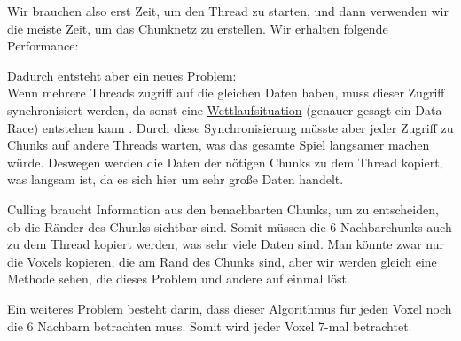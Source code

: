 Wir brauchen also erst Zeit, um den Thread zu starten,
und dann verwenden wir die meiste Zeit, um das
Chunknetz zu erstellen.
Wir erhalten folgende Performance:

\vspace{0.3cm}


\vspace{0.3cm}

Dadurch entsteht aber ein neues Problem: \\
Wenn mehrere Threads zugriff auf die gleichen Daten
haben, muss dieser Zugriff synchronisiert werden,
da sonst eine
\href{https://de.wikipedia.org/wiki/Wettlaufsituation}{Wettlaufsituation}
\cite{wiki_wettlauf} (genauer gesagt ein Data Race)
entstehen kann \cite{nomicon_races}.
Durch diese Synchronisierung müsste aber jeder Zugriff
zu Chunks auf andere Threads warten, was das gesamte
Spiel langsamer machen würde. Deswegen werden die
Daten der nötigen Chunks zu dem Thread kopiert,
was langsam ist, da es sich hier um sehr große Daten
handelt.

Culling braucht Information aus den benachbarten
Chunks, um zu entscheiden, ob die Ränder des Chunks
sichtbar sind. Somit müssen die 6 Nachbarchunks
auch zu dem Thread kopiert werden, was sehr viele
Daten sind. Man könnte zwar nur die Voxels
kopieren, die am Rand des Chunks sind,
aber wir werden gleich eine Methode sehen,
die dieses Problem und andere auf einmal löst.

\vspace{0.3cm}

Ein weiteres Problem besteht darin, dass dieser
Algorithmus für jeden Voxel noch die 6 Nachbarn
betrachten muss. Somit wird jeder Voxel 7-mal
betrachtet.
